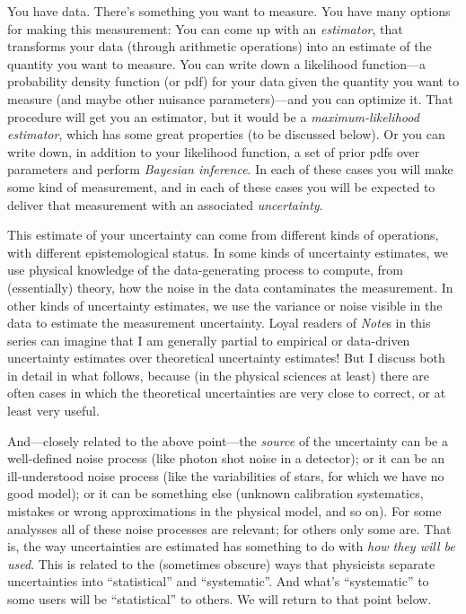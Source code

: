 \documentclass[10pt]{article}
\newcommand{\documentname}{\textsl{Note}}
\begin{document}
You have data. There's something you want to measure. You have many
options for making this measurement: You can come up with an
\textsl{estimator}, that transforms your data (through arithmetic
operations) into an estimate of the quantity you want to measure. You
can write down a likelihood function---a probability density function
(or pdf) for your data given the quantity you want to measure (and
maybe other nuisance parameters)---and you can optimize it. That
procedure will get you an estimator, but it would be a
\textsl{maximum-likelihood estimator}, which has some great
properties (to be discussed below).
Or you can write down, in addition to your likelihood
function, a set of prior pdfs over parameters and perform
\textsl{Bayesian inference}.  In each of these cases you will make
some kind of measurement, and in each of these cases you will be
expected to deliver that measurement with an associated \textsl{uncertainty}.

This estimate of your uncertainty can come from different kinds of operations, with
different epistemological status. In some kinds of uncertainty
estimates, we use physical knowledge of the data-generating process to
compute, from (essentially) theory, how the noise in the data
contaminates the measurement. In other kinds of uncertainty estimates,
we use the variance or noise visible in the data to estimate the measurement
uncertainty. Loyal readers of \documentname s in this series can imagine that
I am generally partial to empirical or data-driven uncertainty estimates over
theoretical uncertainty estimates! But I discuss both in detail in what follows,
because (in the physical sciences at least) there are often cases in which the
theoretical uncertainties are very close to correct, or at least very useful.

And---closely related to the above point---the \emph{source} of the
uncertainty can be a well-defined noise process (like photon shot
noise in a detector); or it can be an ill-understood noise process
(like the variabilities of stars, for which we have no good model); or
it can be something else (unknown calibration systematics, mistakes or
wrong approximations in the physical model, and so on). For some analysses
all of these noise processes are relevant; for others only some are.
That is, the way uncertainties are estimated has something to do with
\emph{how they will be used}. This is related to the (sometimes obscure)
ways that physicists separate uncertainties into ``statistical'' and ``systematic''.
And what's ``systematic'' to some users will be ``statistical'' to others.
We will return to that point below.
\end{document}
